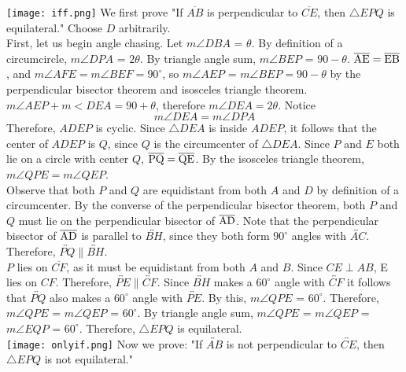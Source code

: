 \documentclass[11pt, letterpaper]{article}
\begin{document}
\begin{solution}{3}

\texttt{[image: iff.png]}
We first prove "If $\overline{AB}$ is perpendicular to $\overline{CE}$, then $\triangle EPQ$ is equilateral." Choose $D$ arbitrarily.\\

First, let us begin angle chasing. Let $m\angle DBA$ = $\theta$. By definition of a circumcircle, $m\angle DPA$ = $2\theta$.  By triangle angle sum, $m\angle BEP$ = $90-\theta$. $\overline{\rm AE} = \overline{\rm EB}$, and $m\angle AFE = m\angle BEF = 90^\circ$, so $m\angle AEP$ = $m\angle BEP = 90-\theta$ by the perpendicular bisector theorem and isosceles triangle theorem. $m\angle AEP + m<DEA = 90 + \theta$, therefore $m\angle DEA = 2\theta$. Notice $$m\angle DEA = m\angle DPA$$ Therefore, $ADEP$ is cyclic. Since $\triangle DEA$ is inside $ADEP$, it follows that the center of $ADEP$ is $Q$, since $Q$ is the circumcenter of $\triangle DEA$. Since $P$ and $E$ both lie on a circle with center $Q$, $\overline{\rm PQ} = \overline{\rm QE}$. By the isosceles triangle theorem, $m\angle QPE = m\angle QEP$. \\

Observe that both $P$ and $Q$ are equidistant from both $A$ and $D$ by definition of a circumcenter. By the converse of the perpendicular bisector theorem, both $P$ and $Q$ must lie on the perpendicular bisector of $\overline{\rm AD}$. Note that the perpendicular bisector of $\overline{\rm AD}$ is parallel to $\overleftrightarrow{BH}$, since they both form $90^\circ$ angles with $\overleftrightarrow{AC}$. Therefore, $\overleftrightarrow{PQ} \parallel \overleftrightarrow{BH}$.\\ 

$P$ lies on $\overline{CF}$, as it must be equidistant from both $A$ and $B$. Since $CE \perp AB$, E lies on $CF$. Therefore, $\overleftrightarrow{PE} \parallel \overleftrightarrow{CF}$. Since $\overleftrightarrow{BH}$ makes a $60^\circ$ angle with $\overleftrightarrow{CF}$ it follows that $\overleftrightarrow{PQ}$ also makes a $60^\circ$ angle with $\overleftrightarrow{PE}$. By this, $m\angle QPE$ = $60^\circ$. Therefore, $m\angle QPE$ = $m\angle QEP$ = $60^\circ$. By triangle angle sum, $m\angle QPE$ = $m\angle QEP$ = $m\angle EQP$ = $60^\circ$. Therefore, $\triangle EPQ$ is equilateral.\\

\texttt{[image: onlyif.png]}
Now we prove: "If $\overleftrightarrow{AB}$ is not perpendicular to $\overleftrightarrow{CE}$, then $\triangle EPQ$ is not equilateral."


\end{solution}
\end{document}
